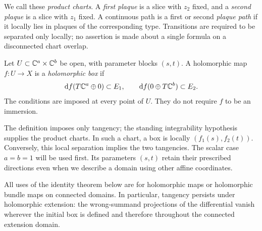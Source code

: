 We call these \emph{product charts}. A \emph{first plaque} is a slice
with $z_2$ fixed, and a \emph{second plaque} is a slice with $z_1$ fixed.
A continuous path is a first or second \emph{plaque path} if it locally
lies in plaques of the corresponding type. Transitions are required
to be separated only locally; no assertion is made about a single
formula on a disconnected chart overlap.

\begin{definition}\label{def:box}
Let $U\subset\mathbb C^a\times\mathbb C^b$ be open, with parameter blocks $(s,t)$.
A holomorphic map $f:U\to X$ is a \emph{holomorphic box} if
\[
\mathrm d f(T\mathbb C^a\oplus0)\subset E_1,\qquad
\mathrm d f(0\oplus T\mathbb C^b)\subset E_2.
\]
The conditions are imposed at every point of $U$. They do not require
$f$ to be an immersion.
\end{definition}

The definition imposes only tangency; the standing integrability
hypothesis supplies the product charts. In such a chart, a box is locally $(f_1(s),f_2(t))$. Conversely,
this local separation implies the two tangencies. The scalar case
$a=b=1$ will be used first. Its parameters $(s,t)$ retain their
prescribed directions even when we describe a domain using other
affine coordinates.

All uses of the identity theorem below are for holomorphic maps or
holomorphic bundle maps on connected domains. In particular, tangency
persists under holomorphic extension: the wrong-summand projections
of the differential vanish wherever the initial box is defined and
therefore throughout the connected extension domain.
